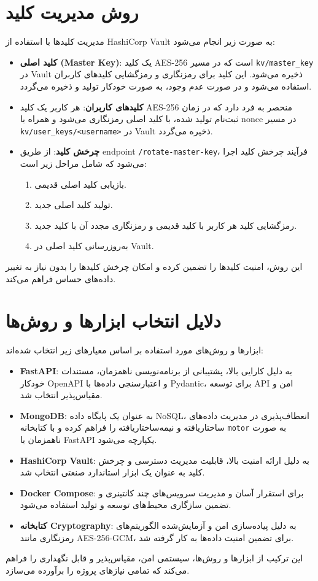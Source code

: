 \documentclass[a4paper,12pt]{article}
\begin{document}
\section{روش مدیریت کلید}
مدیریت کلیدها با استفاده از HashiCorp Vault به صورت زیر انجام می‌شود:
\begin{itemize}
    \item \textbf{کلید اصلی (Master Key)}: یک کلید AES-256 است که در مسیر \texttt{kv/master\_key} در Vault ذخیره می‌شود. این کلید برای رمزنگاری و رمزگشایی کلیدهای کاربران استفاده می‌شود و در صورت عدم وجود، به صورت خودکار تولید و ذخیره می‌گردد.
    \item \textbf{کلیدهای کاربران}: هر کاربر یک کلید AES-256 منحصر به فرد دارد که در زمان ثبت‌نام تولید شده، با کلید اصلی رمزنگاری می‌شود و همراه با nonce در مسیر \texttt{kv/user\_keys/<username>} در Vault ذخیره می‌گردد.
    \item \textbf{چرخش کلید}: از طریق endpoint \texttt{/rotate-master-key}، فرآیند چرخش کلید اجرا می‌شود که شامل مراحل زیر است:
    \begin{enumerate}
        \item بازیابی کلید اصلی قدیمی.
        \item تولید کلید اصلی جدید.
        \item رمزگشایی کلید هر کاربر با کلید قدیمی و رمزنگاری مجدد آن با کلید جدید.
        \item به‌روزرسانی کلید اصلی در Vault.
    \end{enumerate}
\end{itemize}
این روش، امنیت کلیدها را تضمین کرده و امکان چرخش کلیدها را بدون نیاز به تغییر داده‌های حساس فراهم می‌کند.

\section{دلایل انتخاب ابزارها و روش‌ها}
ابزارها و روش‌های مورد استفاده بر اساس معیارهای زیر انتخاب شده‌اند:
\begin{itemize}
    \item \textbf{FastAPI}: به دلیل کارایی بالا، پشتیبانی از برنامه‌نویسی ناهمزمان، مستندات خودکار OpenAPI و اعتبارسنجی داده‌ها با Pydantic، برای توسعه API امن و مقیاس‌پذیر انتخاب شد.
    \item \textbf{MongoDB}: به عنوان یک پایگاه داده NoSQL، انعطاف‌پذیری در مدیریت داده‌های ساختاریافته و نیمه‌ساختاریافته را فراهم کرده و با کتابخانه \texttt{motor} به صورت ناهمزمان با FastAPI یکپارچه می‌شود.
    \item \textbf{HashiCorp Vault}: به دلیل ارائه امنیت بالا، قابلیت مدیریت دسترسی و چرخش کلید به عنوان یک ابزار استاندارد صنعتی انتخاب شد.
    \item \textbf{Docker Compose}: برای استقرار آسان و مدیریت سرویس‌های چند کانتینری و تضمین سازگاری محیط‌های توسعه و تولید استفاده می‌شود.
    \item \textbf{کتابخانه Cryptography}: به دلیل پیاده‌سازی امن و آزمایش‌شده الگوریتم‌های رمزنگاری مانند AES-256-GCM، برای تضمین امنیت داده‌ها به کار گرفته شد.
\end{itemize}
این ترکیب از ابزارها و روش‌ها، سیستمی امن، مقیاس‌پذیر و قابل نگهداری را فراهم می‌کند که تمامی نیازهای پروژه را برآورده می‌سازد.
\end{document}

